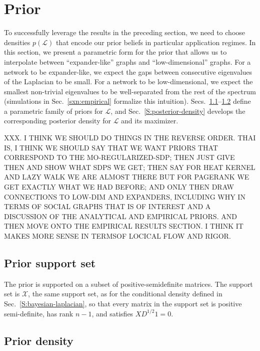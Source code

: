 \documentclass[12pt]{article}
\theoremstyle{plain}
\begin{document}
\section{Prior}
\label{sxn:priors}

To successfully leverage the results in the preceding section, we need
to choose densities $p(\mathcal{L})$ that encode our prior beliefs in
particular application regimes.  In this section, we present a
parametric form for the prior that allows us to interpolate between
``expander-like'' graphs and ``low-dimensional'' graphs.  For a
network to be expander-like, we expect the gaps between consecutive
eigenvalues of the Laplacian to be small.  For a network to be
low-dimensional, we expect the smallest non-trivial eigenvalues to be
well-separated from the rest of the spectrum (simulations in
Sec.~\ref{sxn:empirical} formalize this intuition).
Secs.~\ref{S:prior-support}--\ref{S:prior-density} define a
parametric family of priors for $\mathcal{L}$, and
Sec.~\ref{S:posterior-density} develops the corresponding posterior
density for $\mathcal{L}$ and its maximizer.

XXX.  I THINK WE SHOULD DO THINGS IN THE REVERSE ORDER.  THAI IS, I THINK WE SHOULD SAY THAT WE WANT PRIORS THAT CORRESPOND TO THE MO-REGULARIZED-SDP; THEN JUST GIVE THEN AND SHOW WHAT SDPS WE GET; THEN SAY FOR HEAT KERNEL AND LAZY WALK WE ARE ALMOST THERE BUT FOR PAGERANK WE GET EXACTLY WHAT WE HAD BEFORE; AND ONLY THEN DRAW CONNECTIONS TO LOW-DIM AND EXPANDERS, INCLUDING WHY IN TERMS OF SOCIAL GRAPHS THAT IS OF INTEREST AND A DISCUSSION OF THE ANALYTICAL AND EMPIRICAL PRIORS.  AND THEN MOVE ONTO THE EMPIRICAL RESULTS SECTION.  I THINK IT MAKES MORE SENSE IN TERMSOF LOCICAL FLOW AND RIGOR.

\subsection{Prior support set}
\label{S:prior-support}

The prior is supported on a subset of positive-semidefinite
matrices.  The support set is $\mathcal{X}$, the same support set, as
for the conditional density defined in
Sec.~\ref{S:bayesian-laplacian}, so that every matrix in the support
set is positive semi-definite, has rank $n - 1$, and satisfies
$X D^{1/2} 1 = 0$.


\subsection{Prior density}
\label{S:prior-density}
\end{document}
